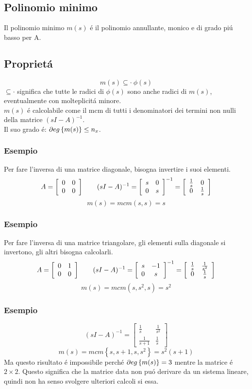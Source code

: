 \documentclass[../main.tex]{subfiles}
\begin{document}
	\subsection{Polinomio minimo}
		Il polinomio minimo $ m(s) $ \'e il polinomio annullante, monico e di grado pi\'u basso per A.
	\subsection*{Propriet\'a}
		\[ m(s) \subseteq \cdot\ \phi(s) \]
		$ \subseteq \cdot $ significa che tutte le radici di $ \phi(s) $ sono anche radici di $ m(s) $, eventualmente con molteplicit\'a minore.\\
		\linebreak
		$ m(s) $ \'e calcolabile come il mcm di tutti i denominatori dei termini non nulli della matrice $ (sI - A)^{-1} $.\\
		Il suo grado \'e: $ \partial eg \left\lbrace m(s) \right\rbrace \leq n_x $.\\
	\subsubsection*{Esempio}
		Per fare l'inversa di una matrice diagonale, bisogna invertire i suoi elementi. 
		\[ A = \left[ \begin{array}{cc} 0 & 0\\ 0 & 0 \end{array} \right] \qquad (sI - A)^{-1} = \left[ \begin{array}{cc} s & 0\\ 0 & s \end{array} \right]^{-1} = \left[ \begin{array}{cc} \frac{1}{s} & 0\\ 0 & \frac{1}{s} \end{array} \right] \]
		\[ m(s) = mcm( s, s) = s \]
	\subsubsection*{Esempio}
		Per fare l'inversa di una matrice triangolare, gli elementi sulla diagonale si invertono, gli altri bisogna calcolarli.
		\[ A = \left[ \begin{array}{cc} 0 & 1\\ 0 & 0 \end{array} \right] \qquad (sI - A)^{-1} = \left[ \begin{array}{cc} s & -1\\ 0 & s \end{array} \right]^{-1} = \left[ \begin{array}{cc} \frac{1}{s} & \frac{1}{s^2}\\ 0 & \frac{1}{s} \end{array} \right] \]
		\[ m(s) = mcm( s, s^2, s) = s^2 \]
	\subsubsection*{Esempio}
		\[
			(sI-A)^{-1} =
			\begin{bmatrix}
				\frac{1}{s} & \frac{1}{s^2}\\
				\frac{1}{s+1} & \frac{1}{s}
			\end{bmatrix}
		\]
		\[ m(s) = mcm \left\lbrace s, s+1, s, s^2 \right\rbrace = s^2(s+1) \]
		Ma questo risultato \'e impossibile perch\'e $ \partial eg \left\lbrace m(s) \right\rbrace = 3 $ mentre la matrice \'e $ 2 \times 2 $. Questo significa che la matrice data non pu\'o derivare da un sistema lineare, quindi non ha senso svolgere ulteriori calcoli si essa.
		
\end{document}
